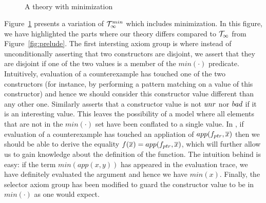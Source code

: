 \begin{figure}
{\[\begin{array}{c}
\end{array}\]}
\caption{A theory with minimization}\label{fig:min-theory}
\end{figure}

Figure~\ref{fig:min-theory} presents a variation of ${\cal T}_\infty^{min}$ which includes minimization.
In this figure, we have highlighted the parts where our theory differs compared to ${\cal T}_\infty$ from
Figure~\ref{fig:prelude}. The first intersting axiom group is  where instead of 
unconditionally asserting that two constructors are disjoint, we assert that they are disjoint if
one of the two values is a member of the $min(\cdot)$ predicate. Intuitively, evaluation of a 
counterexample has touched one of the two constructors (for instance, by performing a pattern matching
on a value of this constructor) and hence we should consider this constructor value different than any 
other one. Similarly  asserts that a constructor value is not $\mathop{unr}$ nor $\mathop{bad}$ if 
it is an interesting value. This leaves the possibility of a model where all elements that are not in 
the $min(\cdot)$ set have been conflated to a single value. In , if evaluation of a counterexample
has touched an appliation of $app(f_{ptr},\overline{x})$ then we should be able to derive the equality 
$f(\overline{x}) = app(f_{ptr},\overline{x})$, which will further allow us to gain knowledge about the definition of the function.
The intuition behind  is easy: if the term $min(app(x,y))$ has appeared in the evaluation trace, 
we have definitely evaluated the argument and hence we have $min(x)$. Finally, the selector axiom group 
has been modified to guard the constructor value to be in $min(\cdot)$ as one would expect. 


